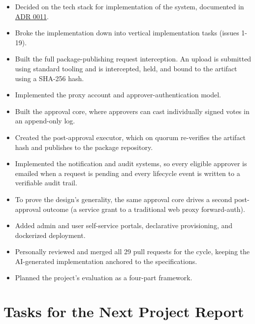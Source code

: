 \documentclass[12pt]{article}
\newcommand{\PRNumber}{3}
\newcommand{\RepoURL}{https://github.com/Ian-Costa18/Cybersecurity-Practicum/blob/progress-report-\PRNumber}
\begin{document}
\begin{itemize}[leftmargin=1.5em, itemsep=2pt]
  \item Decided on the tech stack for implementation of the system, documented in \href{\RepoURL/docs/adr/0011-technology-stack.md}{ADR 0011}.
  \item Broke the implementation down into vertical implementation tasks (issues 1-19).
  \item Built the full package-publishing request interception. An upload is submitted using standard tooling and is intercepted, held, and bound to the artifact using a SHA-256 hash.
  \item Implemented the proxy account and approver-authentication model.
  \item Built the approval core, where approvers can cast individually signed votes in an append-only log.
  \item Created the post-approval executor, which on quorum re-verifies the artifact hash and publishes to the package repository.
  \item Implemented the notification and audit systems, so every eligible approver is emailed when a request is pending and every lifecycle event is written to a verifiable audit trail.
  \item To prove the design's generality, the same approval core drives a second post-approval outcome (a service grant to a traditional web proxy forward-auth).
  \item Added admin and user self-service portals, declarative provisioning, and dockerized deployment.
  \item Personally reviewed and merged all 29 pull requests for the cycle, keeping the AI-generated implementation anchored to the specifications.
  \item Planned the project's evaluation as a four-part framework.
\end{itemize}

\section*{Tasks for the Next Project Report}
\end{document}
